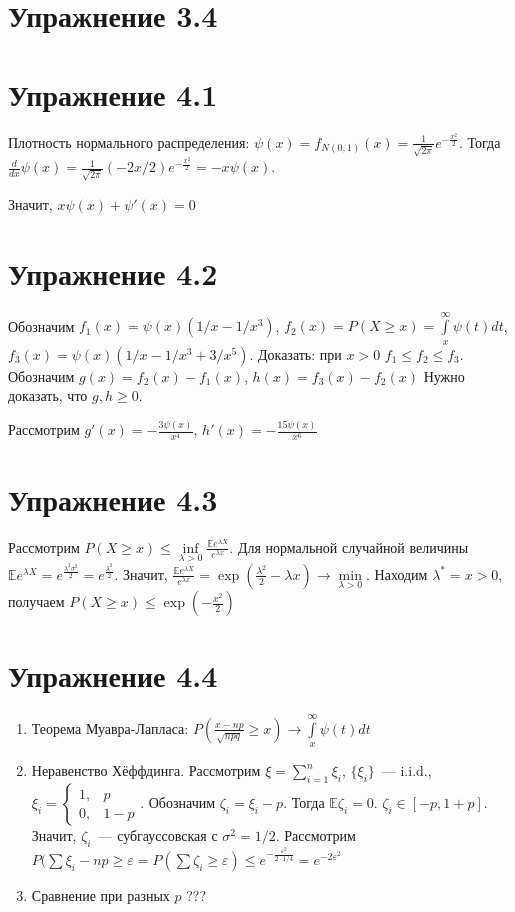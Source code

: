 \documentclass[a4paper]{article}
\def\eps{\varepsilon}
\begin{document}
\section*{Упражнение 3.4}
\section*{Упражнение 4.1}
Плотность нормального распределения: $\psi(x)=f_{N(0,1)}(x)=\frac{1}{\sqrt{2\pi}}e^{-\frac{x^2}{2}}$. Тогда $\frac{d}{dx}\psi(x)=\frac{1}{\sqrt{2\pi}}(-2x/2)e^{-\frac{x^2}{2}}=-x\psi(x)$.

Значит, $\boxed{x\psi(x)+\psi'(x)=0}$
\section*{Упражнение 4.2}
Обозначим $f_1(x)=\psi(x)(1/x-1/x^3)$, $f_2(x)=P(X\geqslant x)=\int\limits_x^\infty\psi(t)dt$, $f_3(x)=\psi(x)(1/x-1/x^3+3/x^5)$. Доказать: при $x>0$ $f_1\leqslant f_2\leqslant f_3$. Обозначим $g(x)=f_2(x)-f_1(x)$, $h(x)=f_3(x)-f_2(x)$ Нужно доказать, что $g,h\geqslant 0$.

Рассмотрим $g'(x)=-\frac{3\psi(x)}{x^4}$, $h'(x)=-\frac{15\psi(x)}{x^6}$
\section*{Упражнение 4.3}
Рассмотрим $P(X\geqslant x)\leqslant\inf\limits_{\lambda > 0}\frac{\mathbb{E}e^{\lambda X}}{e^{\lambda x}}$. Для нормальной случайной величины $\mathbb{E}e^{\lambda X}=e^{\frac{\lambda^2\sigma^2}{2}}=e^{\frac{\lambda^2}{2}}$. Значит, $\frac{\mathbb{E}e^{\lambda X}}{e^{\lambda x}}=\exp(\frac{\lambda^2}{2}-\lambda x)\to\min\limits_{\lambda > 0}$. Находим $\lambda^*=x>0$, получаем $P(X\geqslant x)\leqslant \exp(-\frac{x^2}{2})$
\section*{Упражнение 4.4}
\begin{enumerate}
\item Теорема Муавра-Лапласа: $P(\frac{x-np}{\sqrt{npq}}\geqslant x)\to\int\limits_x^\infty \psi(t)dt$
\item Неравенство Хёффдинга. Рассмотрим $\xi=\sum\limits_{i=1}^n \xi_i$, $\{\xi_i\}$~--- i.i.d., $\xi_i=\begin{cases}
1,&p\\
0,&1-p
\end{cases}$. Обозначим $\zeta_i=\xi_i-p$. Тогда $\mathbb{E}\zeta_i=0$. $\zeta_i\in[-p,1+p]$. Значит, $\zeta_i$~--- субгауссовская с $\sigma^2=1/2$. Рассмотрим $P(\sum \xi_i-np\geqslant \eps=P(\sum \zeta_i\geqslant \eps)\leqslant e^{-\frac{\eps^2}{2\cdot 1/4}}=e^{-2\eps^2}$
\item Сравнение при разных $p$ ???
\end{enumerate}
\end{document}
